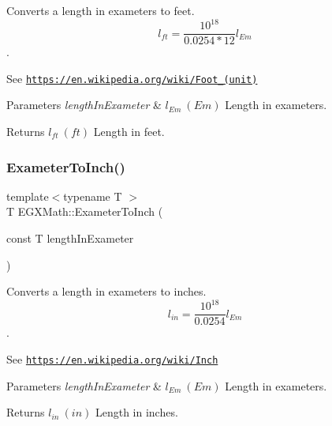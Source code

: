 Converts a length in exameters to feet. \[ l_{ft}= \frac{10^{18}}{0.0254 * 12} l_{Em} \]. 

See \href{https://en.wikipedia.org/wiki/Foot_(unit)}{\tt https\+://en.\+wikipedia.\+org/wiki/\+Foot\+\_\+(unit)} 
\begin{DoxyParams}{Parameters}
{\em length\+In\+Exameter} & $ l_{Em}\ (Em)$ Length in exameters. \\
\hline
\end{DoxyParams}
\begin{DoxyReturn}{Returns}
$ l_{ft}\ (ft)$ Length in feet. 
\end{DoxyReturn}
\mbox{\label{group___e_g_x_math-_conversions-_length_conversions-_exameter-_imperial_gabf4408961480eb2b76d2f5c588df128e}} 
\subsubsection{\texorpdfstring{Exameter\+To\+Inch()}{ExameterToInch()}}
{\footnotesize\ttfamily template$<$typename T $>$ \\
T E\+G\+X\+Math\+::\+Exameter\+To\+Inch (\begin{DoxyParamCaption}\item[{const T}]{length\+In\+Exameter }\end{DoxyParamCaption})}



Converts a length in exameters to inches. \[ l_{in}= \frac{10^{18}}{0.0254} l_{Em} \]. 

See \href{https://en.wikipedia.org/wiki/Inch}{\tt https\+://en.\+wikipedia.\+org/wiki/\+Inch} 
\begin{DoxyParams}{Parameters}
{\em length\+In\+Exameter} & $ l_{Em}\ (Em)$ Length in exameters. \\
\hline
\end{DoxyParams}
\begin{DoxyReturn}{Returns}
$ l_{in}\ (in)$ Length in inches. 
\end{DoxyReturn}
\mbox{\label{group___e_g_x_math-_conversions-_length_conversions-_exameter-_imperial_ga863f9f7f7e2826324fec642027c48614}} 
